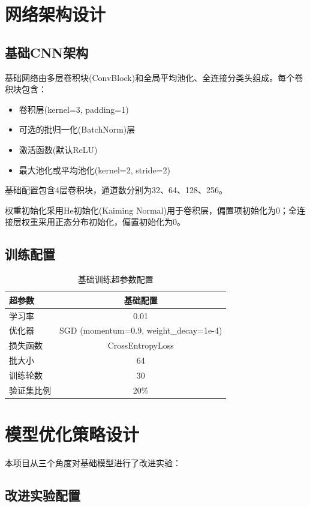 \documentclass[12pt,a4paper]{ctexart}
\begin{document}
\section{网络架构设计}

\subsection{基础CNN架构}
基础网络由多层卷积块(ConvBlock)和全局平均池化、全连接分类头组成。每个卷积块包含：
\begin{itemize}
    \item 卷积层(kernel=3, padding=1)
    \item 可选的批归一化(BatchNorm)层
    \item 激活函数(默认ReLU)
    \item 最大池化或平均池化(kernel=2, stride=2)
\end{itemize}

基础配置包含4层卷积块，通道数分别为32、64、128、256。

权重初始化采用He初始化(Kaiming Normal)用于卷积层，偏置项初始化为0；全连接层权重采用正态分布初始化，偏置初始化为0。

\subsection{训练配置}
\begin{table}[H]
    \centering
    \begin{tabular}{lc}
        \toprule
        \textbf{超参数} & \textbf{基础配置} \\
        \midrule
        学习率 & 0.01 \\
        优化器 & SGD (momentum=0.9, weight\_decay=1e-4) \\
        损失函数 & CrossEntropyLoss \\
        批大小 & 64 \\
        训练轮数 & 30 \\
        验证集比例 & 20\% \\
        \bottomrule
    \end{tabular}
    \caption{基础训练超参数配置}
\end{table}
\section{模型优化策略设计}

本项目从三个角度对基础模型进行了改进实验：

\subsection{改进实验配置}
\end{document}
